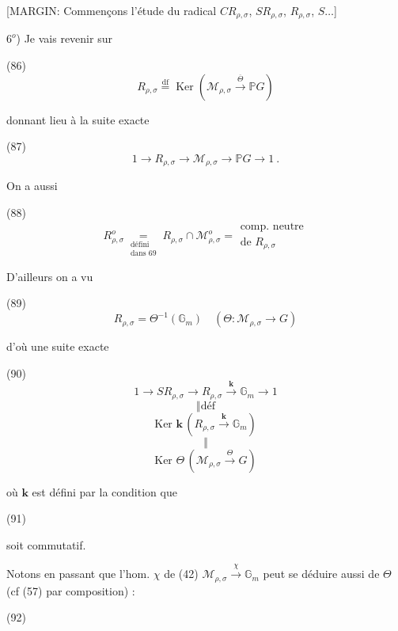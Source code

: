 \begin{enumerate}
\newpage


[MARGIN: Commençons l'étude du radical $C R_{\rho,\sigma}$, $S R_{\rho,\sigma}$, $R_{\rho,\sigma}$, $S \dots$]

$6^o$) Je vais revenir sur

(86) $$R_{\rho,\sigma} \overset{\text{df}}{=} \operatorname{Ker}(\mathcal{M}_{\rho,\sigma} \overset{\overline{\Theta}}{\longrightarrow} \mathbb{P} G)$$

donnant lieu à la suite exacte

(87) $$1 \longrightarrow R_{\rho,\sigma} \longrightarrow \mathcal{M}_{\rho,\sigma} \longrightarrow \mathbb{P} G \longrightarrow 1 \ .$$

On a aussi

(88) $$R_{\rho,\sigma}^o \underset{\substack{\text{défini} \\ \text{dans 69}}}{=} R_{\rho,\sigma} \cap \mathcal{M}_{\rho,\sigma}^o = \substack{\text{comp. neutre} \\ \text{de } R_{\rho,\sigma}}$$

D'ailleurs on a vu

(89) $$R_{\rho,\sigma} = \Theta^{-1}(\mathbb{G}_m) \quad (\Theta: \mathcal{M}_{\rho,\sigma} \to G)$$

d'où une suite exacte

(90) 
$$1 \longrightarrow S R_{\rho,\sigma} \longrightarrow R_{\rho,\sigma} \overset{\mathbf{k}}{\longrightarrow} \mathbb{G}_m \longrightarrow 1$$
$$ \Vert \text{déf}$$
$$\text{Ker } \mathbf{k} \, (R_{\rho,\sigma} \overset{\mathbf{k}}{\longrightarrow} \mathbb{G}_m)$$
$$ \Vert$$
$$\text{Ker } \Theta \, (\mathcal{M}_{\rho,\sigma} \overset{\Theta}{\longrightarrow} G)$$

où $\mathbf{k}$ est défini par la condition que

(91)

soit commutatif.

Notons en passant que l'hom. $\chi$ de (42) $\mathcal{M}_{\rho,\sigma} \overset{\chi}{\longrightarrow} \mathbb{G}_m$ peut se déduire aussi de $\Theta$ (cf (57) par composition) :

(92)


\end{enumerate}
